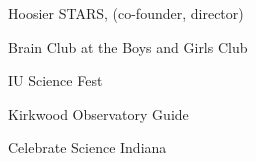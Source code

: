 \newpage
{}

\begin{cventries}

  \cventry
    {} %
    {} %
    {} %
    {} %
    {
      \begin{cvitems} %
	\item{Hoosier STARS, (co-founder, director)}
        \item {Brain Club at the Boys and Girls Club}
	\item{IU Science Fest}
	\item{Kirkwood Observatory Guide}
	\item{Celebrate Science Indiana}
      \end{cvitems}
    }

\end{cventries}

	





